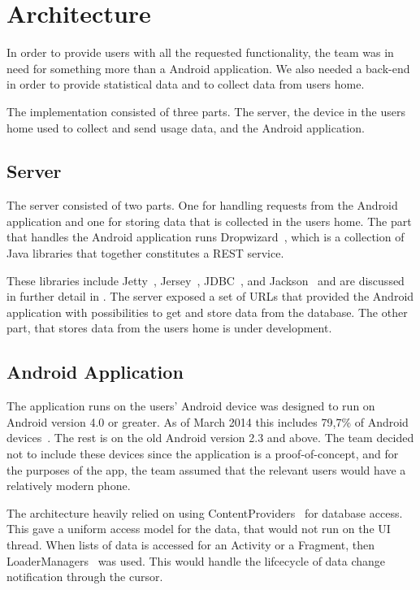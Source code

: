 \section{Architecture}
In order to provide users with all the requested functionality, the team was in need for something more than a Android application. We also needed a back-end in order to provide statistical data and to collect data from users home.

The implementation consisted of three parts. The server, the device in the users home used to collect and send usage data, and the Android application.

\subsection{Server}
The server consisted of two parts. One for handling requests from the Android application and one for storing data that is collected in the users home. 
The part that handles the Android application runs Dropwizard~\cite{dropwizard}, which is a collection of Java libraries that together constitutes a REST service. 

These libraries include Jetty~\cite{jetty}, Jersey~\cite{jersey}, JDBC~\cite{jdbc}, and Jackson~\cite{jackson} and are discussed in further detail in .
The server exposed a set of URLs that provided the Android application with 
possibilities to get and store data from the database. The other part, that stores data from the users home is under development.

\subsection{Android Application}
The application runs on the users' Android device was designed to run on Android version 4.0 or greater. As of March 2014 this includes 79,7\% of Android devices~\cite{AndroidDeviceFragmentation}. The rest is on the old Android version 2.3 and above. The team decided not to include these devices since the application is a proof-of-concept, and for the purposes of the app, the team assumed that the relevant users would have a relatively modern phone. 

The architecture heavily relied on using ContentProviders~\cite{contentproviders} for database access. This gave a uniform access model for the data, that would not run on the UI thread. When lists of data is accessed for an Activity or a Fragment, then LoaderManagers~\cite{loadermanager} was used. This would handle the lifcecycle of data change notification through the cursor. 

